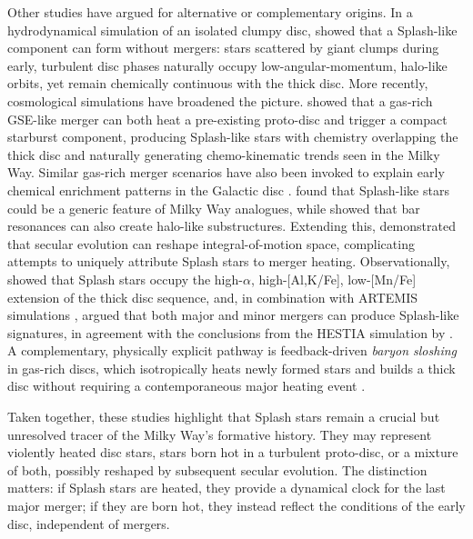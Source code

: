 \documentclass[fleqn,usenatbib]{mnras}
\begin{document}
Other studies have argued for alternative or complementary origins. In a hydrodynamical simulation of an isolated clumpy disc, \citet{Amarante2020} showed that a Splash-like component can form without mergers: stars scattered by giant clumps during early, turbulent disc phases naturally occupy low-angular-momentum, halo-like orbits, yet remain chemically continuous with the thick disc. More recently, cosmological simulations have broadened the picture. \citet{Grand2020} showed that a gas-rich GSE-like merger can both heat a pre-existing proto-disc and trigger a compact starburst component, producing Splash-like stars with chemistry overlapping the thick disc and naturally generating chemo-kinematic trends seen in the Milky Way. Similar gas-rich merger scenarios have also been invoked to explain early chemical enrichment patterns in the Galactic disc \citep{Ciuca2024}. \citet{Dillamore2022} found that Splash-like stars could be a generic feature of Milky Way analogues, while \citet{Dillamore2023} showed that bar resonances can also create halo-like substructures. Extending this, \citet{Dillamore2025} demonstrated that secular evolution can reshape integral-of-motion space, complicating attempts to uniquely attribute Splash stars to merger heating. Observationally, \citet{Kisku2025} showed that Splash stars occupy the high-$\alpha$, high-[Al,K/Fe], low-[Mn/Fe] extension of the thick disc sequence, and, in combination with ARTEMIS simulations \citep{Font2020}, argued that both major and minor mergers can produce Splash-like signatures, in agreement with the conclusions from the HESTIA simulation by \citet{Khoperskov2023}. A complementary, physically explicit pathway is feedback-driven \textit{baryon sloshing} in gas-rich discs, which isotropically heats newly formed stars and builds a thick disc without requiring a contemporaneous major heating event \citep{BlandHawthorn2025}.

Taken together, these studies highlight that Splash stars remain a crucial but unresolved tracer of the Milky Way’s formative history. They may represent violently heated disc stars, stars born hot in a turbulent proto-disc, or a mixture of both, possibly reshaped by subsequent secular evolution. The distinction matters: if Splash stars are heated, they provide a dynamical clock for the last major merger; if they are born hot, they instead reflect the conditions of the early disc, independent of mergers.
\end{document}
